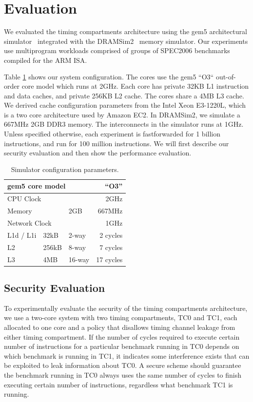 \section{Evaluation}
We evaluated the timing compartments architecture using the gem5 architectural 
simulator~\cite{gem5} integrated with the DRAMSim2~\cite{DRAMSim2} 
memory simulator. Our experiments use multiprogram workloads 
comprised of groups of SPEC2006 benchmarks compiled for the ARM ISA. 

Table \ref{tab:config} shows our system configuration.
The cores use the gem5 ``O3`` out-of-order core model which runs at 2GHz. 
Each core has private 32KB L1 instruction and data caches, and private 256KB L2 
cache. The cores share a 4MB L3 cache. We derived cache configuration 
parameters from the Intel Xeon E3-1220L, which is a two core architecture used 
by Amazon EC2. In DRAMSim2, we simulate a 667MHz 2GB DDR3 memory. The 
interconnects in the simulator runs at 1GHz. Unless specified otherwise, each experiment is 
fastforwarded for 1 billion instructions, and run for 100 million 
instructions. We will first describe our security evaluation and then show
the performance evaluation.

\begin{table}
    \caption{Simulator configuration parameters.}
    \centering
    \begin{tabular}{|l|l|l|r|}
        \hline
        \multicolumn{3}{|l|}{gem5 core model} & ``O3''        \\\hline
        \multicolumn{3}{|l|}{CPU Clock}    & 2GHz             \\\hline
        \hline
        \multicolumn{2}{|l|}{Memory}             & 2GB    & 667MHz  \\\hline
        \hline
        \multicolumn{3}{|l|}{Network Clock}      & 1GHz \\\hline
        \hline
        L1d / L1i  & 32kB   & 2-way  & 2 cycles\\\hline
        L2         & 256kB  & 8-way  & 7 cycles \\\hline
        L3         & 4MB    & 16-way & 17 cycles  \\\hline
    \end{tabular}
    \label{tab:config}
\end{table}

\subsection{Security Evaluation}
To experimentally evaluate the security of the timing compartments
architecture, we use a two-core system with two timing compartments, TC0 and TC1,
each allocated to one core and a policy that disallows timing channel leakage from
either timing compartment. If the number of cycles required to execute certain number of instructions 
for a particular benchmark running in TC0 depends on which benchmark is running in 
TC1, it indicates some interference exists that can be exploited to leak information about TC0. 
A secure scheme should guarantee the benchmark running in TC0 always uses the same number of cycles
to finish executing certain number of instructions, regardless what benchmark TC1 is running. 

